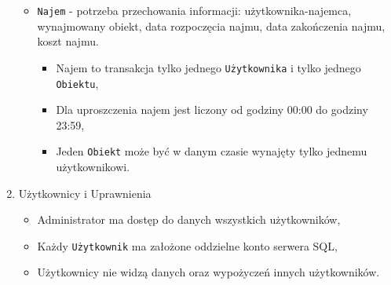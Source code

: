 \begin{enumerate}
\begin{itemize}
		\item \texttt{Najem} - potrzeba przechowania informacji: użytkownika-najemca, wynajmowany obiekt, data rozpoczęcia najmu, data zakończenia najmu, koszt najmu.
		\begin{itemize}
			\item Najem to transakcja tylko jednego \texttt{Użytkownika} i tylko jednego \texttt{Obiektu},
			\item Dla uproszczenia najem jest liczony od godziny 00:00 do godziny 23:59,
			\item Jeden \texttt{Obiekt} może być w danym czasie wynajęty tylko jednemu użytkownikowi.
		\end{itemize}
		
	\end{itemize}

	\item Użytkownicy i Uprawnienia
		\begin{itemize}
			\item Administrator ma dostęp do danych wszystkich użytkowników,
			\item Każdy \texttt{Użytkownik} ma założone oddzielne konto serwera SQL,
			\item Użytkownicy nie widzą danych oraz wypożyczeń innych użytkowników.
		\end{itemize}

\end{enumerate}